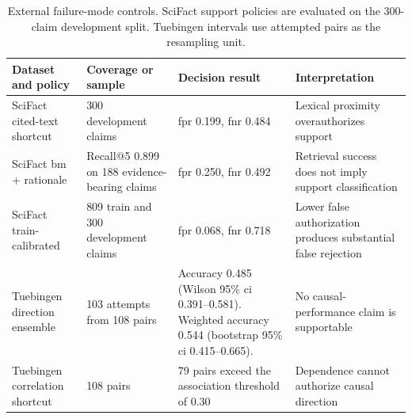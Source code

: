 \begin{table}[t!]
\centering
\caption{External failure-mode controls. SciFact support policies are evaluated
on the 300-claim development split. Tuebingen intervals use attempted pairs as
the resampling unit.}
\label{tab:external-controls}
\footnotesize
\renewcommand{\arraystretch}{1.12}
\begin{tabularx}{\textwidth}{@{}p{}p{}p{}Y@{}}
\toprule
Dataset and policy & Coverage or sample & Decision result & Interpretation \\
\midrule
SciFact cited-text shortcut & 300 development claims & \acs{fpr} 0.199, \acs{fnr} 0.484 & Lexical proximity overauthorizes support \\
SciFact \acs{bm} + rationale & Recall@5 0.899 on 188 evidence-bearing claims & \acs{fpr} 0.250, \acs{fnr} 0.492 & Retrieval success does not imply support classification \\
SciFact train-calibrated & 809 train and 300 development claims & \acs{fpr} 0.068, \acs{fnr} 0.718 & Lower false authorization produces substantial false rejection \\
\addlinespace[2pt]
Tuebingen direction ensemble & 103 attempts from 108 pairs & Accuracy 0.485 (Wilson 95\% \acs{ci} 0.391--0.581). Weighted accuracy 0.544 (bootstrap 95\% \acs{ci} 0.415--0.665). & No causal-performance claim is supportable \\
Tuebingen correlation shortcut & 108 pairs & 79 pairs exceed the association threshold of 0.30 & Dependence cannot authorize causal direction \\
\bottomrule
\end{tabularx}
\end{table}
